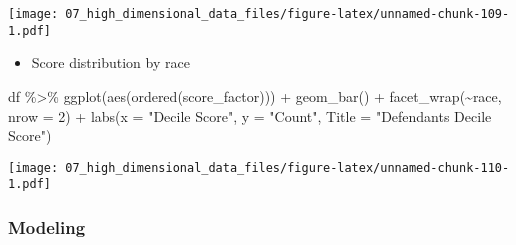 \documentclass[
]{book}
\newenvironment{Shaded}{\begin{snugshade}}{\end{snugshade}}
\newcommand{\AttributeTok}[1]{\textcolor[rgb]{0.77,0.63,0.00}{#1}}
\newcommand{\DecValTok}[1]{\textcolor[rgb]{0.00,0.00,0.81}{#1}}
\newcommand{\FunctionTok}[1]{\textcolor[rgb]{0.00,0.00,0.00}{#1}}
\newcommand{\NormalTok}[1]{#1}
\newcommand{\SpecialCharTok}[1]{\textcolor[rgb]{0.00,0.00,0.00}{#1}}
\newcommand{\StringTok}[1]{\textcolor[rgb]{0.31,0.60,0.02}{#1}}
\providecommand{\tightlist}{%
  \setlength{\itemsep}{0pt}\setlength{\parskip}{0pt}}
\begin{document}
\texttt{[image: 07\_high\_dimensional\_data\_files/figure-latex/unnamed-chunk-109-1.pdf]}

\begin{itemize}
\tightlist
\item
  Score distribution by race
\end{itemize}

\begin{Shaded}
\begin{Highlighting}[]
\NormalTok{df }\SpecialCharTok{\%\textgreater{}\%}
  \FunctionTok{ggplot}\NormalTok{(}\FunctionTok{aes}\NormalTok{(}\FunctionTok{ordered}\NormalTok{(score\_factor))) }\SpecialCharTok{+} 
          \FunctionTok{geom\_bar}\NormalTok{() }\SpecialCharTok{+}
          \FunctionTok{facet\_wrap}\NormalTok{(}\SpecialCharTok{\textasciitilde{}}\NormalTok{race, }\AttributeTok{nrow =} \DecValTok{2}\NormalTok{) }\SpecialCharTok{+}
          \FunctionTok{labs}\NormalTok{(}\AttributeTok{x =} \StringTok{"Decile Score"}\NormalTok{,}
               \AttributeTok{y =} \StringTok{"Count"}\NormalTok{,}
               \AttributeTok{Title =} \StringTok{"Defendant\textquotesingle{}s Decile Score"}\NormalTok{)}
\end{Highlighting}
\end{Shaded}

\texttt{[image: 07\_high\_dimensional\_data\_files/figure-latex/unnamed-chunk-110-1.pdf]}

\hypertarget{modeling-1}{%
\subsubsection{Modeling}\label{modeling-1}}
\end{document}
